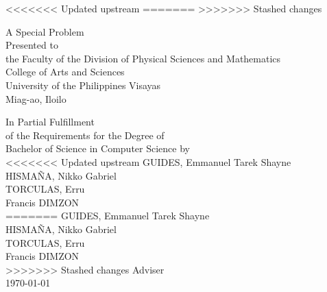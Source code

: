 \begin{titlepage}
\centering

<<<<<<< Updated upstream
=======
>>>>>>> Stashed changes

\vspace{1.75cm}
A Special Problem\\
Presented to\\
the Faculty of the Division of Physical Sciences and Mathematics\\
College of Arts and Sciences\\
University of the Philippines Visayas\\
Miag-ao, Iloilo

\vspace{1.75cm}
In Partial Fulfillment\\
of the Requirements for the Degree of\\
Bachelor of Science in Computer Science
\vspace{1.75cm}
by\\

\vspace{1cm}
<<<<<<< Updated upstream
GUIDES, Emmanuel Tarek Shayne \\
HISMAÑA, Nikko Gabriel \\
TORCULAS, Erru \\

\vspace{1.75cm}
Francis DIMZON\\
=======
GUIDES, Emmanuel Tarek Shayne\\
HISMAÑA, Nikko Gabriel \\
TORCULAS, Erru  \\

\vspace{1.75cm}
Francis DIMZON \\
>>>>>>> Stashed changes
Adviser\\

\vspace{1.75cm}
\today
\end{titlepage}
